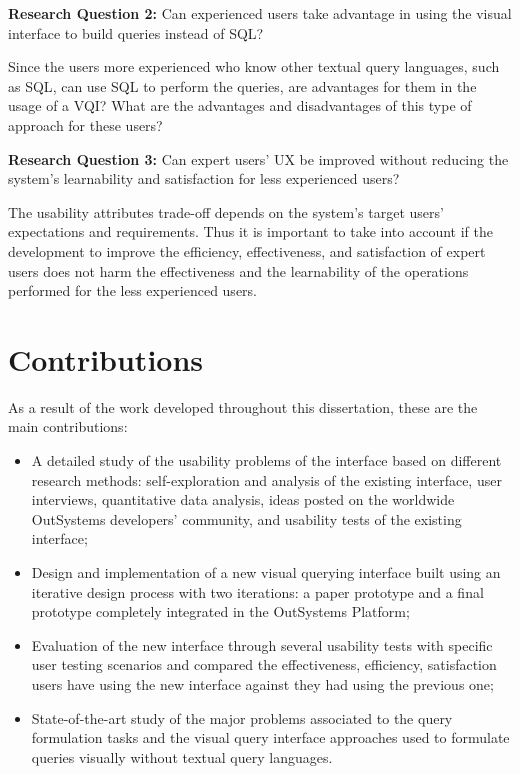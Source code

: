 \medskip

\textbf{Research Question 2:} Can experienced users take advantage in using the visual interface to build queries instead of \gls{SQL}?

\medskip

Since the users more experienced who know other textual query languages, such as \gls{SQL}, can use \gls{SQL} to perform the queries, are advantages for them in the usage of a \gls{VQI}? What are the advantages and disadvantages of this type of approach for these users?

\medskip

\textbf{Research Question 3:} Can expert users' \gls{UX} be improved without reducing the system's learnability and satisfaction for less experienced users?


\medskip

The usability attributes trade-off depends on the system's target users' expectations and requirements. Thus it is important to take into account if the development to improve the efficiency, effectiveness, and satisfaction of expert users does not harm the effectiveness and the learnability of the operations performed for the less experienced users.

\section{Contributions}
\label{sec:contributions}
As a result of the work developed throughout this dissertation, these are the main contributions:

\begin{itemize}
  \item A detailed study of the usability problems of the interface based on different research methods: self-exploration and analysis of the existing interface, user interviews, quantitative data analysis, ideas posted on the worldwide OutSystems developers' community, and usability tests of the existing interface;
  \item Design and implementation of a new visual querying interface built using an iterative design process with two iterations: a paper prototype and a final prototype completely integrated in the OutSystems Platform;
  \item Evaluation of the new interface through several usability tests with specific user testing scenarios and compared the effectiveness, efficiency, satisfaction users have using the new interface against they had using the previous one;
  \item State-of-the-art study of the major problems associated to the query formulation tasks and the visual query interface approaches used to formulate queries visually without textual query languages.
\end{itemize} 

